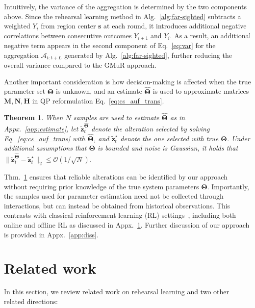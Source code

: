 \documentclass{article}
\theoremstyle{plain}
\newtheorem{theorem}{Theorem}[section]
\theoremstyle{definition}
\theoremstyle{remark}
\def \Eq {Eq.}
\def \thm {Thm.}
\def \sA {\mathcal{A}}
\def \N {\mathbf{N}}
\def \s {\mathbf{s}}
\def \M {\mathbf{M}}
\def \H {\mathbf{H}}
\def \z {\mathbf{z}}
\begin{document}
Intuitively, the variance of the aggregation is determined by the two components above. 
Since the rehearsal learning method in Alg.~\ref{alg:far-sighted} subtracts a weighted \(Y_i\) from region center \(\s\) at each round, it introduces additional negative correlations between consecutive outcomes \(Y_{i+1}\) and \(Y_i\). 
As a result, an additional negative term appears in the second component of \Eq~\eqref{eq:var} for the aggregation \(\sA_{t:t+L}\) generated by Alg.~\ref{alg:far-sighted}, further reducing the overall variance compared to the GMuR approach. 

Another important consideration is how decision-making is affected when the true parameter set \(\bm{\Theta}\) is unknown, and an estimate \(\hat{\bm{\Theta}}\) is used to approximate matrices \(\M, \N, \H\) in QP reformulation \Eq~\eqref{eq:cs_auf_trans}.

\begin{theorem}
  \label{thm:regret}
  When \(N\) samples are used to estimate \(\hat{\bm{\Theta}}\) as in Appx.~\ref{app:estimate}, let \(\tilde{\z}_t^{\hat{\bm{\Theta}}}\) denote the alteration selected by solving \Eq~\eqref{eq:cs_auf_trans} with \(\hat{\bm{\Theta}}\), and \(\tilde{\z}_t^\star\) denote the one selected with true \(\bm{\Theta}\). 
  Under additional assumptions that \(\bm{\Theta}\) is bounded and noise is Gaussian, it holds that
  \(
  \|\tilde{\z}_t^{\hat{\bm{\Theta}}} - \tilde{\z}_t^\star \|_2 \leq \mathcal{O}(1/\sqrt{N} )
  \).
\end{theorem}
\vskip -0.05in

\thm~\ref{thm:regret} ensures that reliable alterations can be identified by our approach without requiring prior knowledge of the true system parameters \(\bm{\Theta}\). 
Importantly, the samples used for parameter estimation need not be collected through interactions, but can instead be obtained from historical observations. 
This contrasts with classical reinforcement learning (RL) settings~\citep{sutton2018reinforcement}, including both online and offline RL as discussed in Appx.~\ref{sec:related}. 
Further discussion of our approach is provided in Appx.~\ref{app:diss}.




\newpage
\section{Related work}
\label{sec:related}
\vspace{-0.03in}

In this section, we review related work on rehearsal learning and two other related directions:
\vspace{-0.03in} 
\end{document}
